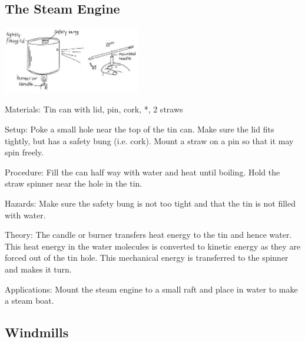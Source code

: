 \begin{multicols}{2}
\subsection{The Steam Engine}

\begin{center}
\includegraphics[width=0.45\textwidth]{./img/vso/steam-engine.png}
\end{center}

\begin{description*}
\item[Materials:]{Tin can with lid, pin, cork, *, 2 straws}
\item[Setup:]{Poke a small hole near the top of the tin can. Make sure the lid fits tightly, but has a safety bung (i.e. cork). Mount a straw on a pin so that it may spin freely.}
\item[Procedure:]{Fill the can half way with water and heat until boiling. Hold the straw spinner near the hole in the tin.}
\item[Hazards:]{Make sure the safety bung is not too tight and that the tin is not filled with water.}
\item[Theory:]{The candle or burner transfers heat energy to the tin and hence water. This heat energy in the water molecules is converted to kinetic energy as they are forced out of the tin hole. This mechanical energy is transferred to the spinner and makes it turn.}
\item[Applications:]{Mount the steam engine to a small raft and place in water to make a steam boat.}
\end{description*}

\subsection{Windmills}


\end{multicols}
